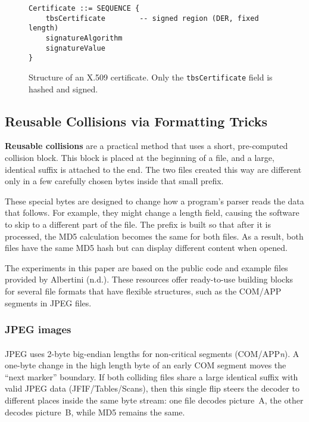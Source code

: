 \documentclass[runningheads]{llncs}
\begin{document}
    \begin{figure}[h!]
        \centering
        \begin{lstlisting}[basicstyle=\ttfamily\small]
Certificate ::= SEQUENCE {
    tbsCertificate        -- signed region (DER, fixed length)
    signatureAlgorithm
    signatureValue
}
        \end{lstlisting}
        \caption{Structure of an X.509 certificate. Only the \texttt{tbsCertificate} field is hashed and signed.}
        \label{fig:x509-structure}
    \end{figure}


    \subsection{Reusable Collisions via Formatting Tricks}

    \textbf{Reusable collisions} are a practical method that uses a short, pre-computed collision block. This block is placed at the beginning of a file, and a large, identical suffix is attached to the end. The two files created this way are different only in a few carefully chosen bytes inside that small prefix.

    These special bytes are designed to change how a program's parser reads the data that follows. For example, they might change a length field, causing the software to skip to a different part of the file. The prefix is built so that after it is processed, the MD5 calculation becomes the same for both files. As a result, both files have the same MD5 hash but can display different content when opened.

    The experiments in this paper are based on the public code and example files provided by Albertini (n.d.). These resources offer ready-to-use building blocks for several file formats that have flexible structures, such as the COM/APP segments in JPEG files.

    \subsubsection{JPEG images}

    \paragraph{}
    JPEG uses 2-byte big-endian lengths for non-critical segments (COM/APP\textit{n}). A one-byte change in the high length byte of an early COM segment moves the ``next marker'' boundary. If both colliding files share a large identical suffix with valid JPEG data (JFIF/Tables/Scans), then this single flip steers the decoder to different places inside the same byte stream: one file decodes picture~A, the other decodes picture~B, while MD5 remains the same.
\end{document}
